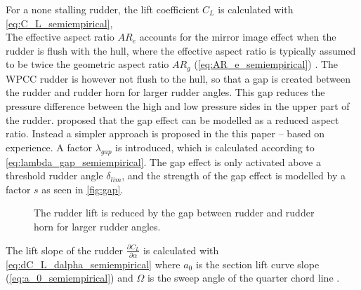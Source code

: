 For a none stalling rudder, the lift coefficient $C_L$ is calculated with \autoref{eq:C_L_semiempirical},
\begin{equation}
    \label{eq:C_L_semiempirical}
    
\end{equation}
%
\begin{equation}
    \label{eq:alpha_semiempirical}
    
\end{equation}
The effective aspect ratio $AR_e$ accounts for the mirror image effect when the rudder is flush with the hull, where the effective aspect ratio is typically assumed to be twice the geometric aspect ratio $AR_g$ (\autoref{eq:AR_e_semiempirical}) \citep{hughes_tempest_2011}.
The WPCC rudder is however not flush to the hull, so that a gap is created between the rudder and rudder horn for larger rudder angles. This gap reduces the pressure difference between the high and low pressure sides in the upper part of the rudder. \citet{matusiak_dynamics_2021} proposed that the gap effect can be modelled as a reduced aspect ratio. Instead a simpler approach is proposed in the this paper -- based on experience. A factor $\lambda_{gap}$ is introduced, which is calculated according to \autoref{eq:lambda_gap_semiempirical}. The gap effect is only activated above a threshold rudder angle $\delta_{lim}$, and the strength of the gap effect is modelled by a factor $s$ as seen in \autoref{fig:gap}.
\begin{equation}
    \label{eq:lambda_gap_semiempirical}
    
\end{equation}
\begin{figure}[h]
    \centering
    
    \caption{The rudder lift is reduced by the gap between rudder and rudder horn for larger rudder angles.}
    \label{fig:gap}
\end{figure}
The lift slope of the rudder $\frac{\partial C_L}{\partial \alpha}$ is calculated with \autoref{eq:dC_L_dalpha_semiempirical} where $a_0$ is the section lift curve slope (\autoref{eq:a_0_semiempirical}) and $\Omega$ is the sweep angle of the quarter chord line \citep{lewis_principles_1989}.
\begin{equation}
    \label{eq:dC_L_dalpha_semiempirical}
    
\end{equation}
